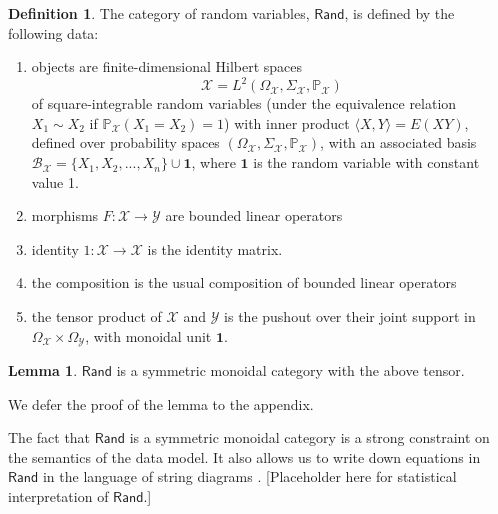 \documentclass{article}
\theoremstyle{definition}
\newtheorem{lemma}[theorem]{Lemma}
\newtheorem{definition}[theorem]{Definition}
\newcommand{\redout}[1]{{\color{red}#1}}
\newcommand{\Cat}[1]{\mathsf{#1}}
\def\Rand{\Cat{Rand}}
\def\Cor{\textnormal{Cor}}
\def\One{\textbf{1}}
\begin{document}
\begin{definition}
The category of random variables, $\Rand$, is defined by the following data:
\begin{enumerate}
\item objects are finite-dimensional Hilbert spaces \[ \mathcal{X} = L^2(\Omega_\mathcal{X}, \Sigma_\mathcal{X}, \mathbb{P}_\mathcal{X})\] of square-integrable random variables (under the equivalence relation $X_1 \sim X_2$ if $\mathbb{P}_\mathcal{X}(X_1 = X_2) = 1$) with inner product $\langle X,Y\rangle = E(XY)$, defined over probability spaces $(\Omega_\mathcal{X}, \Sigma_\mathcal{X}, \mathbb{P}_\mathcal{X})$, with an associated basis $\mathcal{B}_\mathcal{X} = \{ X_1, X_2, ..., X_n \} \cup \One$, where $\One$ is the random variable with constant value 1. %
\item morphisms $F: \mathcal{X} \to \mathcal{Y}$ are bounded linear operators
\item identity $1 : \mathcal{X} \to \mathcal{X}$ is the identity matrix.
\item the composition is the usual composition of bounded linear operators
\item the tensor product of $\mathcal{X}$ and $\mathcal{Y}$ is the pushout over their joint support in $\Omega_\mathcal{X} \times \Omega_\mathcal{Y}$, with monoidal unit $\One$.

\end{enumerate}
\end{definition}

\begin{lemma}
$\Rand$ is a symmetric monoidal category with the above tensor.
\end{lemma}

We defer the proof of the lemma to the appendix.

The fact that $\Rand$ is a symmetric monoidal category is a strong constraint on the semantics of the data model. It also allows us to write down equations in $\Rand$ in the language of string diagrams \cite{selinger13}. \redout{[Placeholder here for statistical interpretation of $\Rand$.]} %
\end{document}

